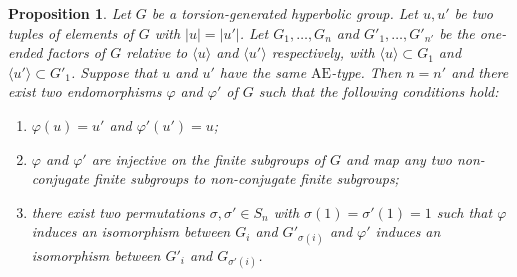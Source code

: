\documentclass[a4paper, 11pt]{amsart}
\newtheorem{prop}[te]{Proposition}
\theoremstyle{definition}
\theoremstyle{remark}
\begin{document}
\begin{prop}\label{main_theorem1}
Let $G$ be a torsion-generated  hyperbolic group. Let $u,u'$ be two tuples of elements of $G$ with $\vert u\vert =\vert u'\vert $. Let $G_1,\ldots,G_n$ and $G'_1,\ldots,G'_{n'}$ be the one-ended factors of $G$ relative to $\langle u\rangle$ and $\langle u'\rangle$ respectively, with $\langle u\rangle\subset G_1$ and $\langle u'\rangle\subset G'_1$. Suppose that $u$ and $u'$ have the same $\mathrm{AE}$-type. Then $n=n'$ and there exist two endomorphisms $\varphi$ and $\varphi'$ of $G$ such that the following conditions hold:
\begin{enumerate}[(1)]
    \item $\varphi(u)=u'$ and $\varphi'(u')=u$;
    \item $\varphi$ and $\varphi'$ are injective on the finite subgroups of $G$ and map any two non-conjugate finite subgroups to non-conjugate finite subgroups;
    \item there exist two permutations $\sigma,\sigma'\in S_n$ with $\sigma(1)=\sigma'(1)=1$ such that $\varphi$ induces an isomorphism between $G_i$ and $G'_{\sigma(i)}$ and $\varphi'$ induces an isomorphism between $G'_i$ and $G_{\sigma'(i)}$.
\end{enumerate}
\end{prop}
\end{document}
